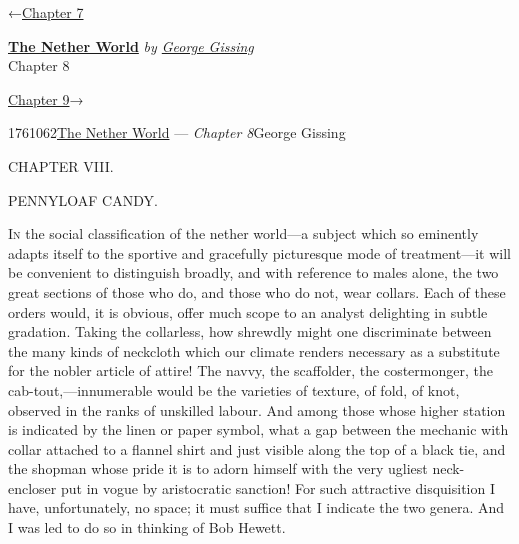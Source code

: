 \hypertarget{headerContainer}{}
\hypertarget{navigationHeader}{}
\protect\hypertarget{headerprevious}{}{←\href{/wiki/The_Nether_World/Volume_1/Chapter_7}{Chapter
7}}

\textbf{\protect\hypertarget{header_title_text}{}{\href{/wiki/The_Nether_World}{The
Nether World}}} \emph{by
\href{/wiki/Author:George_Gissing}{\protect\hypertarget{header_author_text}{}{{George
Gissing}}}}\\
\protect\hypertarget{header_section_text}{}{Chapter 8}

\protect\hypertarget{headernext}{}{\href{/wiki/The_Nether_World/Volume_1/Chapter_9}{Chapter
9}→}

\hypertarget{navigationNotes}{}

\hypertarget{ws-data}{}
\protect\hypertarget{ws-article-id}{}{1761062}\protect\hypertarget{ws-title}{}{\href{/wiki/The_Nether_World}{The
Nether World} --- \emph{Chapter
8}}\protect\hypertarget{ws-author}{}{George Gissing}

{\protect\hypertarget{166}{}{}}

{CHAPTER VIII.}

PENNYLOAF CANDY.

\textsc{In} the social classification of the nether world---a subject
which so eminently adapts itself to the sportive and gracefully
picturesque mode of treatment---it will be convenient to distinguish
broadly, and with reference to males alone, the two great sections of
those who do, and those who do not, wear collars. Each of these orders
would, it is obvious, offer much scope to an analyst delighting in
subtle gradation. Taking the collarless, how shrewdly might one
discriminate between the many kinds of neckcloth which our climate
renders necessary as a substitute for the nobler article of attire! The
navvy, the scaffolder, the costermonger, the cab-tout,---innumerable
would be the varieties of texture, of fold, of knot, observed in the
ranks of {\protect\hypertarget{167}{}{}}unskilled labour. And among
those whose higher station is indicated by the linen or paper symbol,
what a gap between the mechanic with collar attached to a flannel shirt
and just visible along the top of a black tie, and the shopman whose
pride it is to adorn himself with the very ugliest neck-encloser put in
vogue by aristocratic sanction! For such attractive disquisition I have,
unfortunately, no space; it must suffice that I indicate the two genera.
And I was led to do so in thinking of Bob Hewett.


